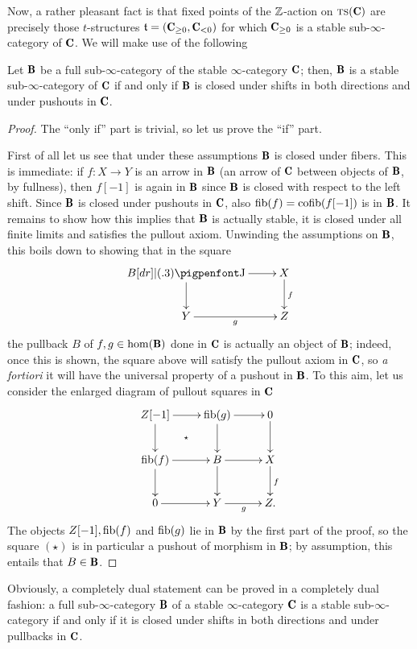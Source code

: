Now, a rather pleasant fact is that fixed points of the $\mathbb{Z}$-action on $\ts(\C)$ are precisely those $t$-structures $\tee=(\C_{\ge 0}, \C_{<0})$ for which $\C_{\ge 0}$ is a stable sub-$\infty$-category of $\C$. We will make use of the following
\begin{lemma}\label{magicstable}
Let $\cB$ be a full sub-$\infty$-category of the stable $\infty$-category $\C$; then, $\cB$ is a stable sub-$\infty$-category of $\C$ if and only if $\cB$ is closed under shifts in both directions and under pushouts in $\C$.
\end{lemma}
\begin{proof}
The ``only if'' part is trivial, so let us prove the ``if'' part.

First of all let us see that under these assumptions $\cB$ is closed under fibers. This is immediate: if $f\colon X\to Y$ is an arrow in $\cB$ (\ie an arrow of $\C$ between objects of $\cB$, by fullness), then $f[-1]$ is again in $\cB$ since $\cB$ is closed with respect to the left shift. Since $\cB$ is closed under pushouts in $\C$, also  $\operatorname{fib}(f)=\operatorname{cofib}(f[-1])$ is in $\cB$. It remains to show how this implies that $\cB$ is actually stable, \ie it is closed under all finite limits and satisfies the pullout axiom. Unwinding the assumptions on $\cB$, this boils down to showing that in the square
\[
\xymatrix{
B \ar[r]\ar[d] \pb &  X\ar[d]^f \\
Y \ar[r]_g& Z
}
\]
the pullback $B$ of $f,g \in \hom(\cB)$ done in $\C$ is actually an object of $\cB$; indeed, once this is shown, the square above will satisfy the pullout axiom in $\C$, 
so \emph{a fortiori} it will have the universal property of a pushout in $\cB$. To this aim, let us consider the enlarged diagram of pullout squares in $\C$
\[
\xymatrix{
Z[-1]\ar[r]\ar[d] \ar@{}[dr]|\star & \fib(g)\ar[r]\ar[d] & 0\ar[d] \\
\fib(f)\ar[r]\ar[d] & B\ar[r]\ar[d] & X \ar[d]^f\\
0\ar[r] & Y \ar[r]_g & Z.
}
\]
The objects $Z[-1], \operatorname{fib}(f)$ and $\operatorname{fib}(g)$ lie in $\cB$ by the first part of the proof, so the square $(\star)$ is in particular a pushout of morphism in $\cB$; by assumption, this entails that $B\in\cB$.
\end{proof}
\begin{remark}\label{oss.shifts.pullback}
Obviously, a completely dual statement can be proved in a completely dual fashion:  a full sub-$\infty$-category $\cB$ of a stable $\infty$-category $\C$ is a stable sub-$\infty$-category if and only if it is closed under shifts in both directions and under pullbacks in $\C$.
\end{remark}
